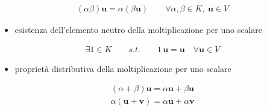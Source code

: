 \documentclass[letterpaper,10pt,italian]{jupyterBook}
\begin{document}
\begin{equation*}
\begin{split}(\alpha \beta) \mathbf{u} = \alpha ( \beta \mathbf{u} ) \qquad \forall \alpha, \beta \in K, \ \mathbf{u} \in V\end{split}
\end{equation*}\begin{itemize}
\item {} 
\sphinxAtStartPar
esistenza dell’elemento neutro della moltiplicazione per uno scalare

\end{itemize}
\begin{equation*}
\begin{split}\exists 1 \in K \qquad s.t. \qquad 1 \, \mathbf{u} = \mathbf{u} \quad \forall \mathbf{u} \in V\end{split}
\end{equation*}\begin{itemize}
\item {} 
\sphinxAtStartPar
proprietà distributiva della moltiplicazione per uno scalare

\end{itemize}
\begin{equation*}
\begin{split}(\alpha + \beta) \mathbf{u} = \alpha \mathbf{u} + \beta \mathbf{u}\end{split}
\end{equation*}\begin{equation*}
\begin{split}\alpha (\mathbf{u} + \mathbf{v}) = \alpha \mathbf{u} + \alpha \mathbf{v} \end{split}
\end{equation*}
\end{document}
